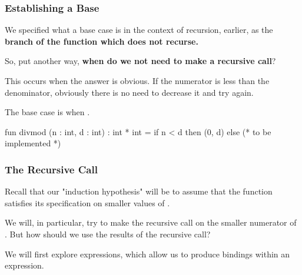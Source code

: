 \documentclass[aspectratio=169]{beamer}
\begin{document}
\begin{frame}[fragile]
  \frametitle{Establishing a Base}

  We specified what a base case is in the context of recursion, earlier, as 
  the \textbf{branch of the function which does not recurse.}

  \vspace{\fill}

  So, put another way, \textbf{when do we not need to make a recursive call}?

  \vspace{5pt}

  This occurs when the answer is obvious. If the numerator is less than the
  denominator, obviously there is no need to decrease it and try again.

  \vspace{\fill}

  The base case is when .

  \vspace{\fill}
  \begin{codeblock}
    fun divmod (n : int, d : int) : int * int = 
      if n < d then
        (0, d)
      else
        (* to be implemented *)
  \end{codeblock}
\end{frame}

\begin{frame}[fragile]
  \frametitle{The Recursive Call}

  Recall that our "induction hypothesis" will be to assume that the 
  function satisfies its specification on smaller values of .

  \vspace{\fill}

  We will, in particular, try to make the recursive call on the smaller numerator 
  of . But how should we use the results of the recursive call?

  \vspace{\fill}

  We will first explore  expressions, which allow us to produce bindings
  within an expression.
\end{frame}
\end{document}
